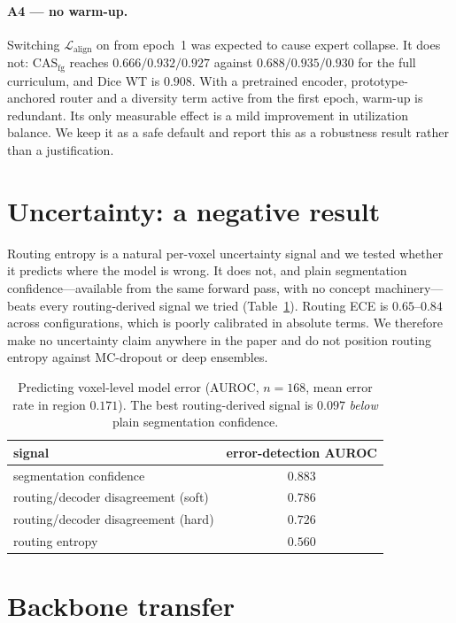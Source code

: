 \documentclass[10pt,twocolumn,letterpaper]{article}
\newcommand{\casfg}{\mathrm{CAS}_{\mathrm{fg}}}
\begin{document}
\paragraph{A4 --- no warm-up.}
Switching $\mathcal{L}_{\text{align}}$ on from epoch~1 was expected to cause expert collapse.
It does not: $\casfg$ reaches $0.666/0.932/0.927$ against $0.688/0.935/0.930$ for the full
curriculum, and Dice WT is $0.908$. With a pretrained encoder, prototype-anchored router and
a diversity term active from the first epoch, warm-up is redundant. Its only measurable
effect is a mild improvement in utilization balance. We keep it as a safe default and report
this as a robustness result rather than a justification.

\section{Uncertainty: a negative result}
\label{sec:uncertainty}

Routing entropy is a natural per-voxel uncertainty signal and we tested whether it predicts
where the model is wrong. It does not, and plain segmentation confidence---available from the
same forward pass, with no concept machinery---beats every routing-derived signal we tried
(Table~\ref{tab:errdet}). Routing ECE is $0.65$--$0.84$ across configurations, which is
poorly calibrated in absolute terms. We therefore make no uncertainty claim anywhere in the
paper and do not position routing entropy against MC-dropout or deep ensembles.

\begin{table}[t]\centering\footnotesize
\setlength{\tabcolsep}{4pt}
\caption{Predicting voxel-level model error (AUROC, $n{=}168$, mean error rate in region
$0.171$). The best routing-derived signal is $0.097$ \emph{below} plain segmentation
confidence.}
\label{tab:errdet}
\begin{tabular}{lc}
\toprule
signal & error-detection AUROC \\
\midrule
segmentation confidence & $\mathbf{0.883}$ \\
routing/decoder disagreement (soft) & $0.786$ \\
routing/decoder disagreement (hard) & $0.726$ \\
routing entropy & $0.560$ \\
\bottomrule
\end{tabular}
\end{table}

\section{Backbone transfer}
\label{sec:backbone}
\end{document}
